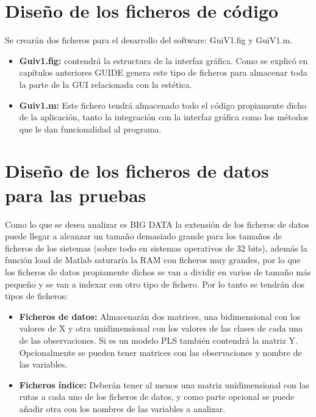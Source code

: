 \section{Diseño de los ficheros de código}
Se crearán dos ficheros para el desarrollo del software: GuiV1.fig y GuiV1.m.

\begin{itemize}
\item \textbf{Guiv1.fig:} contendrá la estructura de la interfaz gráfica. Como se explicó en capítulos anteriores GUIDE genera este tipo de ficheros para almacenar toda la parte de la GUI relacionada con la estética.
\item \textbf{Guiv1.m:} Este fichero tendrá almacenado todo el código propiamente dicho de la aplicación, tanto la integración con la interfaz gráfica como los métodos que le dan funcionalidad al programa.
\end{itemize}
\bigskip

\section{Diseño de los ficheros de datos para las pruebas}

Como lo que se desea analizar es BIG DATA la extensión de los ficheros de datos puede llegar a alcanzar un tamaño demasiado grande para los tamaños de ficheros de los sistemas (sobre todo en sistemas operativos de 32 bits), además la función load de Matlab saturaría la RAM con ficheros muy grandes, por lo que los ficheros de datos propiamente dichos se van a dividir en varios de tamaño más pequeño y se van a indexar con otro tipo de fichero. Por lo tanto se tendrán dos tipos de ficheros:

\bigskip

\begin{itemize}
\item \textbf{Ficheros de datos:} Almacenarán dos matrices, una bidimensional con los valores de X y otra unidimensional con los valores de las clases de cada una de las observaciones. Si es un modelo PLS también contendrá la matriz Y. Opcionalmente se pueden tener matrices con las observaciones y nombre de las variables.
\item \textbf{Ficheros índice:} Deberán tener al menos una matriz unidimensional con las rutas a cada uno de los ficheros de datos, y como parte opcional se puede añadir otra con los nombres de las variables a analizar.

\end{itemize}
